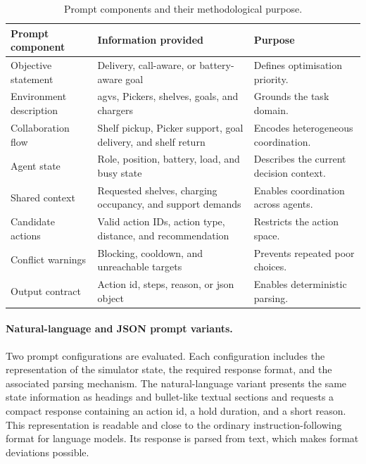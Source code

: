 \begin{table}[H]
\centering
\small
\setlength{\tabcolsep}{4pt}
\begin{tabular}{|p{}|p{}|p{}|}
\hline
\textbf{Prompt component} & \textbf{Information provided} & \textbf{Purpose} \\
\hline
Objective statement & Delivery, call-aware, or battery-aware goal & Defines optimisation priority. \\
\hline
Environment description & \glspl{agv}, Pickers, shelves, goals, and chargers & Grounds the task domain. \\
\hline
Collaboration flow & Shelf pickup, Picker support, goal delivery, and shelf return & Encodes heterogeneous coordination. \\
\hline
Agent state & Role, position, battery, load, and busy state & Describes the current decision context. \\
\hline
Shared context & Requested shelves, charging occupancy, and support demands & Enables coordination across agents. \\
\hline
Candidate actions & Valid action IDs, action type, distance, and recommendation & Restricts the action space. \\
\hline
Conflict warnings & Blocking, cooldown, and unreachable targets & Prevents repeated poor choices. \\
\hline
Output contract & Action id, steps, reason, or \gls{json} object & Enables deterministic parsing. \\
\hline
\end{tabular}
\caption{Prompt components and their methodological purpose.}
\label{tab:prompt-components-purpose}
\end{table}

\paragraph{Natural-language and JSON prompt variants.}
Two prompt configurations are evaluated.
Each configuration includes the representation of the simulator state, the required response format, and the associated parsing mechanism.
The natural-language variant presents the same state information as headings and bullet-like textual sections and requests a compact response containing an action id, a hold duration, and a short reason.
This representation is readable and close to the ordinary instruction-following format for language models.
Its response is parsed from text, which makes format deviations possible.

